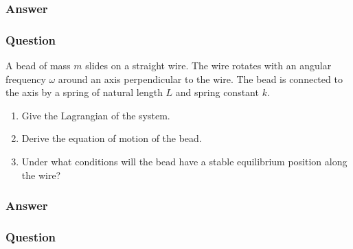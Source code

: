 \subsubsection{Answer}



\subsubsection{Question}
A bead of mass $m$ slides on a straight wire. The wire rotates with an angular frequency $\omega$ around an axis perpendicular to the wire. The bead is connected to the axis by a spring of natural length $L$ and spring constant $k$.
\begin{enumerate}
	\item Give the Lagrangian of the system.
	\item Derive the equation of motion of the bead.
	\item Under what conditions will the bead have a stable equilibrium position along the wire? 
\end{enumerate}

\subsubsection{Answer}








\subsubsection{Question}

